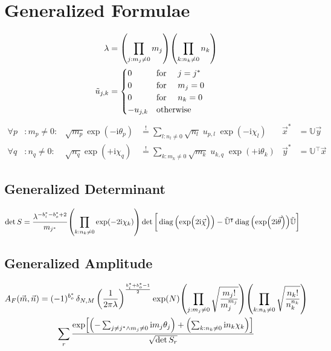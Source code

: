 \documentclass[
	english,
	a4paper,
	fontsize=10pt,
	parskip=half,
	titlepage=true,
	DIV=12,
	final
]{scrreprt}
\newcommand*{\transp}{\ensuremath{^\intercal}}
\newcommand*{\iunit}{\ensuremath{\mathrm{i}}}
\newcommand*{\equalCond}{  \mathop{=}\limits^!  }
\DeclareMathOperator{\diag}{diag}
\begin{document}
\section{Generalized Formulae}
\begin{align}
	\lambda
&=
	\qty( \prod_{j : m_j \neq 0} m_j )
	\qty( \prod_{k : n_k \neq 0} n_k )
\label{eqn:DefLambda_generic}
\\
	\tilde{u}_{j,k} 
&=
	\begin{cases}
		0			&\qq*{for } j = j^* \\
		0			&\qq*{for } m_j = 0 \\
		0			&\qq*{for } n_k = 0 \\
		-u_{j,k}		&\qotherwise*
	\end{cases}
\label{eqn:DefReducedDFT_generic}
\end{align}
\begin{align}
	\forall p &: m_p \neq 0 :
&
	\sqrt{m_p} \exp(-\iunit \theta_p)
&\equalCond
	\sum_{l : n_l \neq 0} \sqrt{n_l} \; u_{p,l} \; \exp(-\iunit\chi_l)
&
	\vec{x}^{*} &= \mathbb{U} \vec{y}
\label{eqn:FourierLinkForward_generic}
\\
	\forall q &: n_q \neq 0 :
&
	\sqrt{n_q} \exp(+\iunit \chi_q)
&\equalCond
	\sum_{k : m_k \neq 0}
	\sqrt{m_k} \; u_{k,q} \; \exp(+\iunit\theta_k)
&
	\vec{y}^{*} &= \mathbb{U}\transp \vec{x}
\label{eqn:FourierLinkBackward_generic}
\end{align}

\subsection{Generalized Determinant}
\begin{align}
	\det S
&=
	\frac{ \lambda^{-b_i^* - b_o^* + 2} }{ m_{j^*} }
	\qty( \prod_{k: n_k \neq 0} \exp(-2\iunit \chi_k) )
	\det\qty[\bigg.
		\diag\qty(\exp(\Big.2\iunit\vec{\chi}))
		-
		\tilde{\mathbb{U}}\transp
		\diag\qty(\exp(2\iunit\vec{\theta}))
		\tilde{\mathbb{U}}
	]
\label{eqn:detS_generic}
\end{align}

\subsection{Generalized Amplitude}
\begin{multline}
	A_F(\vec{m}, \vec{n})
=
	(-1)^{b_o^*} \, \delta_{N,M} \, 
	\qty(
		\frac{1}{2\pi\lambda}
	)^{\frac{b_i^* + b_o^* - 1}{2}}
	\exp(N)
	\qty( \prod_{j : m_j \neq 0}
		\sqrt{\frac
			{ m_j! }
			{ m_j^{m_j} }
	})
	\qty( \prod_{k : n_k \neq 0}
		\sqrt{\frac
			{ n_k! }
			{ n_k^{n_k} }
	})
\\
	\sum_r
		\frac
		{\exp[
			\qty(- \sum_{j\neq j^* \land m_j \neq 0} \iunit m_j \theta_j) + 
			\qty(  \sum_{k : n_k \neq 0}             \iunit n_k \chi  _k)
		]}
		{\sqrt{\det S_r}}
\label{eqn:Amp_generic}
\end{multline}
\end{document}
